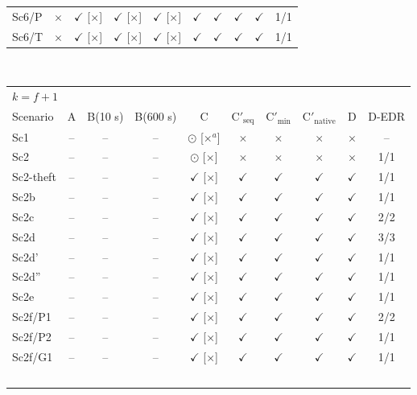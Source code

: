 \documentclass[10pt]{article}
\begin{document}
\begin{table}[!htbp]
\begin{tabular}{@{}lccccccccc@{}}
Sc6/P & $\times$ & $\checkmark$ [$\times$] & $\checkmark$ [$\times$] & $\checkmark$ [$\times$] & $\checkmark$ & $\checkmark$ & $\checkmark$ & $\checkmark$ & 1/1 \\
Sc6/T & $\times$ & $\checkmark$ [$\times$] & $\checkmark$ [$\times$] & $\checkmark$ [$\times$] & $\checkmark$ & $\checkmark$ & $\checkmark$ & $\checkmark$ & 1/1 \\
\midrule
\end{tabular}
\\[4pt]
\begin{tabular}{@{}lccccccccc@{}}
\midrule
\multicolumn{10}{l}{$k = f+1$} \\
Scenario & A & B(10 s) & B(600 s) & C & C$'_{\mathrm{seq}}$ & C$'_{\min}$ & C$'_{\mathrm{native}}$ & D & D-EDR \\
\midrule
Sc1 & -- & -- & -- & $\odot$ [$\times$$^{a}$] & $\times$ & $\times$ & $\times$ & $\times$ & -- \\
Sc2 & -- & -- & -- & $\odot$ [$\times$] & $\times$ & $\times$ & $\times$ & $\times$ & 1/1 \\
Sc2-theft & -- & -- & -- & $\checkmark$ [$\times$] & $\checkmark$ & $\checkmark$ & $\checkmark$ & $\checkmark$ & 1/1 \\
Sc2b & -- & -- & -- & $\checkmark$ [$\times$] & $\checkmark$ & $\checkmark$ & $\checkmark$ & $\checkmark$ & 1/1 \\
Sc2c & -- & -- & -- & $\checkmark$ [$\times$] & $\checkmark$ & $\checkmark$ & $\checkmark$ & $\checkmark$ & 2/2 \\
Sc2d & -- & -- & -- & $\checkmark$ [$\times$] & $\checkmark$ & $\checkmark$ & $\checkmark$ & $\checkmark$ & 3/3 \\
Sc2d' & -- & -- & -- & $\checkmark$ [$\times$] & $\checkmark$ & $\checkmark$ & $\checkmark$ & $\checkmark$ & 1/1 \\
Sc2d'' & -- & -- & -- & $\checkmark$ [$\times$] & $\checkmark$ & $\checkmark$ & $\checkmark$ & $\checkmark$ & 1/1 \\
Sc2e & -- & -- & -- & $\checkmark$ [$\times$] & $\checkmark$ & $\checkmark$ & $\checkmark$ & $\checkmark$ & 1/1 \\
Sc2f/P1 & -- & -- & -- & $\checkmark$ [$\times$] & $\checkmark$ & $\checkmark$ & $\checkmark$ & $\checkmark$ & 2/2 \\
Sc2f/P2 & -- & -- & -- & $\checkmark$ [$\times$] & $\checkmark$ & $\checkmark$ & $\checkmark$ & $\checkmark$ & 1/1 \\
Sc2f/G1 & -- & -- & -- & $\checkmark$ [$\times$] & $\checkmark$ & $\checkmark$ & $\checkmark$ & $\checkmark$ & 1/1 \\
$$
\end{tabular}
\end{table}
\end{document}
